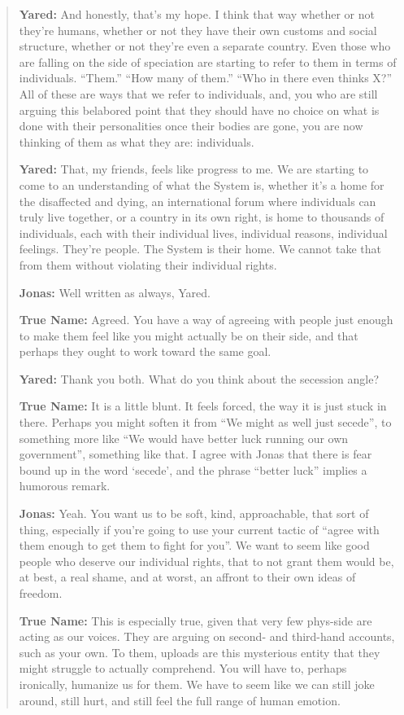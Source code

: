 \begin{quote}
\textbf{Yared:} And honestly, that's my hope. I think that way whether or not they're humans, whether or not they have their own customs and social structure, whether or not they're even a separate country. Even those who are falling on the side of speciation are starting to refer to them in terms of individuals. ``Them.'' ``How many of them.'' ``Who in there even thinks X?'' All of these are ways that we refer to individuals, and, you who are still arguing this belabored point that they should have no choice on what is done with their personalities once their bodies are gone, you are now thinking of them as what they are: individuals.

\textbf{Yared:} That, my friends, feels like progress to me. We are starting to come to an understanding of what the System is, whether it's a home for the disaffected and dying, an international forum where individuals can truly live together, or a country in its own right, is home to thousands of individuals, each with their individual lives, individual reasons, individual feelings. They're people. The System is their home. We cannot take that from them without violating their individual rights.

\textbf{Jonas:} Well written as always, Yared.

\textbf{True Name:} Agreed. You have a way of agreeing with people just enough to make them feel like you might actually be on their side, and that perhaps they ought to work toward the same goal.

\textbf{Yared:} Thank you both. What do you think about the secession angle?

\textbf{True Name:} It is a little blunt. It feels forced, the way it is just stuck in there. Perhaps you might soften it from ``We might as well just secede'', to something more like ``We would have better luck running our own government'', something like that. I agree with Jonas that there is fear bound up in the word `secede', and the phrase ``better luck'' implies a humorous remark.

\textbf{Jonas:} Yeah. You want us to be soft, kind, approachable, that sort of thing, especially if you're going to use your current tactic of ``agree with them enough to get them to fight for you''. We want to seem like good people who deserve our individual rights, that to not grant them would be, at best, a real shame, and at worst, an affront to their own ideas of freedom.

\textbf{True Name:} This is especially true, given that very few phys-side are acting as our voices. They are arguing on second- and third-hand accounts, such as your own. To them, uploads are this mysterious entity that they might struggle to actually comprehend. You will have to, perhaps ironically, humanize us for them. We have to seem like we can still joke around, still hurt, and still feel the full range of human emotion.


\end{quote}
